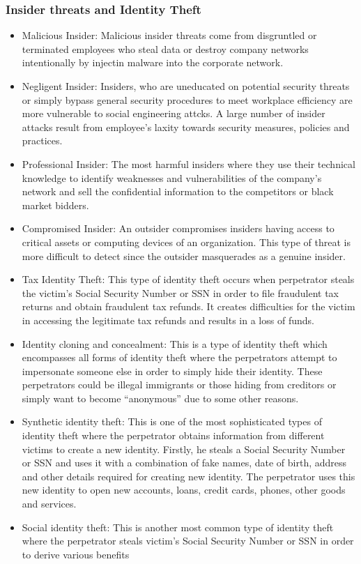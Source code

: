 \subsubsection{Insider threats and Identity Theft}
\begin{itemize}
    \item Malicious Insider: Malicious insider threats come from disgruntled or terminated employees who steal data or destroy company networks intentionally by injectin malware into the corporate network.
    \item Negligent Insider: Insiders, who are uneducated on potential security threats or simply bypass general security procedures to meet workplace efficiency are more vulnerable to social engineering attcks. A large number of insider attacks result from employee's laxity towards security measures, policies and practices.
    \item Professional Insider: The most harmful insiders where they use their technical knowledge to identify weaknesses and vulnerabilities of the company's network and sell the confidential information to the competitors or black market bidders.
    \item Compromised Insider: An outsider compromises insiders having access to critical assets or computing devices of an organization. This type of threat is more difficult to detect since the outsider masquerades as a genuine insider.
    \item Tax Identity Theft: This type of identity theft occurs when perpetrator steals the victim's Social Security Number or SSN in order to file fraudulent tax returns and obtain fraudulent tax refunds. It creates difficulties for the victim in accessing the legitimate tax refunds and results in a loss of funds.
    \item Identity cloning and concealment: This is a type of identity theft which encompasses all forms of identity theft where the perpetrators attempt to impersonate someone else in order to simply hide their identity. These perpetrators could be illegal immigrants or those hiding from creditors or simply want to become “anonymous” due to some other reasons.
    \item Synthetic identity theft: This is one of the most sophisticated types of identity theft where the perpetrator obtains information from different victims to create a new identity. Firstly, he steals a Social Security Number or SSN and uses it with a combination of fake names, date of birth, address and other details required for creating new identity. The perpetrator uses this new identity to open new accounts, loans, credit cards, phones, other goods and services.
    \item Social identity theft: This is another most common type of identity theft where the perpetrator steals victim's Social Security Number or SSN in order to derive various benefits 
\end{itemize}
